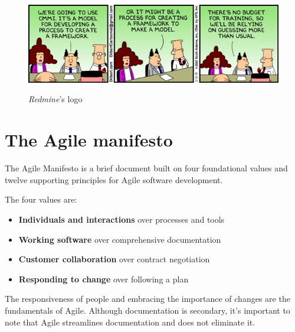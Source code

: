 	\begin{figure}[H]
		\centering
		\includegraphics[width=\textwidth]{resources/BffFTn_CAAAEvGn}\\
		\caption{\textit{Redmine}'s logo}
	\end{figure}

\section{The Agile manifesto}

	The Agile Manifesto is a brief document built on four foundational values and twelve supporting principles for Agile software development. 

	The four values are:
	\begin{itemize}
		\item \textbf{Individuals and interactions} over processes and tools
		\item \textbf{Working software} over comprehensive documentation
		\item \textbf{Customer collaboration} over contract negotiation
		\item \textbf{Responding to change} over following a plan
	\end{itemize}

	The responsiveness of people and embracing the importance of changes are the fundamentals of Agile.
	Although documentation is secondary, it's important to note that Agile streamlines documentation and does not eliminate it.


